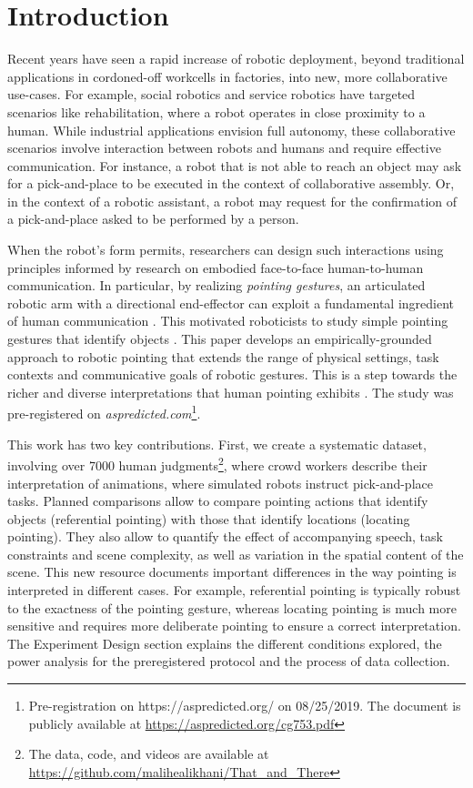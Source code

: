 \section{Introduction}
\label{intro}

Recent years have seen a rapid increase of robotic deployment, beyond traditional applications in cordoned-off workcells in factories, into new, more collaborative use-cases. For example, social robotics and service robotics have targeted scenarios like rehabilitation, where a robot operates in close proximity to a human. While industrial applications envision full autonomy, these collaborative scenarios involve interaction between robots and humans and require effective communication. For instance, a robot that is not able to reach an object may ask for a pick-and-place to be executed in the context of collaborative assembly. Or, in the context of a robotic assistant, a robot may request for the confirmation of a pick-and-place asked to be performed by a person.

When the robot's form permits, researchers can design such interactions using principles informed by research on embodied face-to-face human-to-human communication.  In particular, by realizing \emph{pointing gestures}, an articulated robotic arm with a directional end-effector can exploit a fundamental ingredient of human communication \cite{kita2003pointing}.  This motivated roboticists to study simple pointing gestures that identify objects \cite{han2018placing,holladay2014legible,zhao2016experimental}.   This paper develops an empirically-grounded approach to robotic pointing that extends the range of physical settings, task contexts and communicative goals of robotic gestures. This is a step towards the richer and diverse interpretations that human pointing exhibits \cite{kendon:2004}. The study was pre-registered on \textit{aspredicted.com}\footnote{Pre-registration on https://aspredicted.org/ on 08/25/2019. The document is publicly available at \url{https://aspredicted.org/cg753.pdf}}. 

This work has two key contributions.  First, we create a systematic dataset, involving over 7000 human judgments\footnote{ The data, code, and videos are available at  \url{https://github.com/malihealikhani/That_and_There} }, where crowd workers describe their interpretation of animations, where simulated robots instruct pick-and-place tasks.  Planned comparisons allow to compare pointing actions that identify objects (referential pointing) with those that identify locations (locating pointing). They also allow to quantify the effect of accompanying speech, task constraints and scene complexity, as well as variation in the spatial content of the scene.  This new resource documents important differences in the way pointing is interpreted in different cases.  For example, referential pointing is typically robust to the exactness of the pointing gesture, whereas locating pointing is much more sensitive and requires more deliberate pointing to ensure a correct interpretation.  The Experiment Design section explains the different conditions explored, the power analysis for the preregistered protocol and the process of data collection. 

